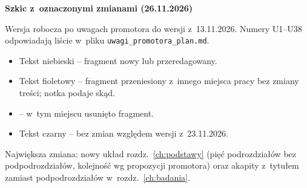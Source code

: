 \clearpage
\thispagestyle{empty}
{\Large\bfseries Szkic z~oznaczonymi zmianami (26.11.2026)\par}\medskip
Wersja robocza po uwagach promotora do wersji z~13.11.2026. Numery
U1--U38 odpowiadają liście w~pliku \texttt{uwagi\_promotora\_plan.md}.
\begin{itemize}
  \item {\color{kolorZmiana}Tekst niebieski} -- fragment nowy lub przeredagowany.
  \item {\color{kolorPrzen}Tekst fioletowy} -- fragment przeniesiony z~innego
        miejsca pracy bez zmiany treści; notka
        {\color{kolorPrzen}\footnotesize\sffamily[\dots]} podaje skąd.
  \item {\color{red!75!black}\footnotesize{}} -- w~tym
        miejscu usunięto fragment.
  \item Tekst czarny -- bez zmian względem wersji z~23.11.2026.
\end{itemize}
Największa zmiana: nowy układ rozdz.~\ref{ch:podstawy} (pięć podrozdziałów
bez podpodrozdziałów, kolejność wg propozycji promotora) oraz akapity
z~tytułem zamiast podpodrozdziałów w~rozdz.~\ref{ch:badania}.
\clearpage
